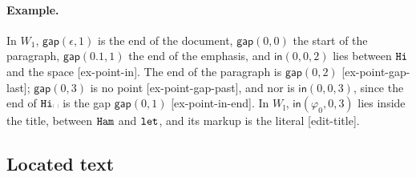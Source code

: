 \documentclass[11pt]{article}
\numberwithin{equation}{section}
\newcommand{\kw}[1]{\ensuremath{\mathsf{#1}}}
\newcommand{\str}[1]{\ensuremath{\text{\texttt{#1}}}}
\newcommand{\vs}{\text{\textvisiblespace}}
\begin{document}
\paragraph{Example.}  In $W_1$, $\kw{gap}(\epsilon, 1)$ is the end of the
document, $\kw{gap}(0, 0)$ the start of the paragraph, $\kw{gap}(0.1, 1)$
the end of the emphasis, and $\kw{in}(0, 0, 2)$ lies between $\str{Hi}$ and
the space [ex-point-in].  The end of the paragraph is $\kw{gap}(0, 2)$
[ex-point-gap-last]; $\kw{gap}(0, 3)$ is no point [ex-point-gap-past], and
nor is $\kw{in}(0, 0, 3)$, since the end of $\str{Hi}\vs$ is the gap
$\kw{gap}(0, 1)$ [ex-point-in-end].  In $W_{\mathrm{l}}$,
$\kw{in}(\varphi_0, 0, 3)$ lies inside the title, between $\str{Ham}$ and
$\str{let}$, and its markup is the literal [edit-title].

\subsection{Located text}
\end{document}
